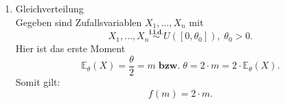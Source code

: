 \documentclass[10pt]{article}
\newcommand{\FZV}{X_1, \ldots, X_n} %
\newcommand{\EW}{\mathbb{E}} %
\newenvironment{BSP}[1][]
{\begin{Beispiel}[frametitle=#1]}{\end{Beispiel}}
\begin{document}
\begin{BSP}[Beispiel 1.3.1 (Momentenmethoden-Schätzer)]
\begin{enumerate}[label = (\roman*)]
			\begin{equation*}
				\left(
				\begin{array}{c}
					\mu\\
					\sigma^2\\
				\end{array}
				\right)
				\mapsto 
				\left(
				\begin{array}{c}
					\mu\\
					\sigma^2+\mu^2\\
				\end{array}
				\right) =
				\left(
				\begin{array}{c}
					m_1\\
					m_2\\
				\end{array}
				\right)
			\end{equation*}
			Hier ist also
			\begin{equation*}
				m_1 = \mu
			\end{equation*}
			und
			\begin{equation*}
				m_2 - m_1^2 = \sigma^2 + \mu^2 - \mu^2 = \sigma^2.
			\end{equation*}
			
			Damit ist hier
			
			\begin{equation*}
				f(\left(
				\begin{array}{c}
					m_1\\
					m_2\\
				\end{array}
				\right)) = 
				\left(
				\begin{array}{c}
					m_1\\
					m_2 - m_1^2\\
				\end{array}
				\right).
			\end{equation*}
			
			
			
			\item Gleichverteilung\\
			Gegeben sind Zufallsvariablen $\FZV$ mit
			\begin{equation*}
				\FZV \overset{\textbf{i.i.d.}}{\sim} U([0,\theta_0]), \; \theta_0 >0.
			\end{equation*}
			Hier ist das erste Moment
			\begin{equation*}
				\EW_\theta (X) = \frac{\theta} {2} = m \; \textbf{bzw.} \;
				\theta = 2\cdot m = 2 \cdot \EW_\theta(X).
			\end{equation*}
			Somit gilt:
			\begin{equation*}
				f(m) = 2\cdot m.
			\end{equation*}
		\end{enumerate}
	\end{BSP}
	
\end{document}
